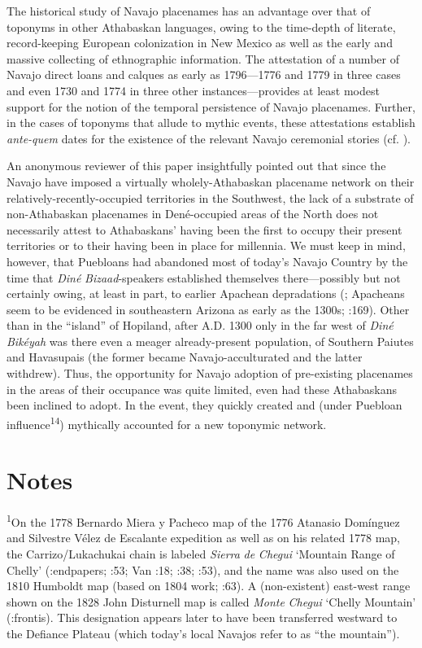   The historical study of Navajo placenames has an advantage over that of toponyms in other Athabaskan languages, owing to the time-depth of literate, record-keeping European colonization in New Mexico as well as the early and massive collecting of ethnographic information.  The attestation of a number of Navajo direct loans and calques as early as 1796—1776 and 1779 in three cases and even 1730 and 1774 in three other instances—provides at least modest support for the notion of the temporal persistence of Navajo placenames.  Further, in the cases of toponyms that allude to mythic events, these attestations establish \textit{ante-quem} dates for the existence of the relevant Navajo ceremonial stories (cf. \citealt{Brugge1973}).

  An anonymous reviewer of this paper insightfully pointed out that since the Navajo have imposed a virtually wholely-Athabaskan placename network on their relatively-recently-occupied territories in the Southwest, the lack of a substrate of non-Athabaskan placenames in Dené-occupied areas of the North does not necessarily attest to Athabaskans’ having been the first to occupy their present territories or to their having been in place for millennia.  We must keep in mind, however, that Puebloans had abandoned most of today’s Navajo Country by the time that \textit{Diné} \textit{Bizaad}{}-speakers established themselves there—possibly but not certainly owing, at least in part, to earlier Apachean depradations (\citealt{Jett1964}; Apacheans seem to be evidenced in southeastern Arizona as early as the 1300s; \citealt{Seymour2013}:169).  Other than in the “island” of Hopiland, after A.D. 1300 only in the far west of \textit{Diné} \textit{Bikéyah} was there even a meager already-present population, of Southern Paiutes and Havasupais (the former became Navajo-acculturated and the latter withdrew).  Thus, the opportunity for Navajo adoption of pre-existing placenames in the areas of their occupance was quite limited, even had these Athabaskans been inclined to adopt.  In the event, they quickly created and (under Puebloan influence\textsuperscript{14}) mythically accounted for a new toponymic network.

\section{\textbf{Notes}}

\textsuperscript{1}On the 1778 Bernardo Miera y Pacheco map of the 1776 Atanasio Domínguez and Silvestre Vélez de Escalante expedition as well as on his related 1778 map, the Carrizo/Lukachukai chain is labeled \textit{Sierra} \textit{de} \textit{Chegui} ‘Mountain Range of Chelly’ (\citealt{McNitt1972}:endpapers; \citealt{Bailey1964a}:53; Van \citealt{Valkenburgh1999}:18; \citealt{Kessell2013}:38; \citealt{Eidenbach2012}:53), and the name was also used on the 1810 Humboldt map (based on 1804 work; \citealt{Eidenbach2012}:63).  A (non-existent) east-west range shown on the 1828 John Disturnell map is called \textit{Monte} \textit{Chegui} ‘Chelly Mountain’ (\citealt{Tyler1985}:frontis).  This designation appears later to have been transferred westward to the Defiance Plateau (which today’s local Navajos refer to as “the mountain”).

